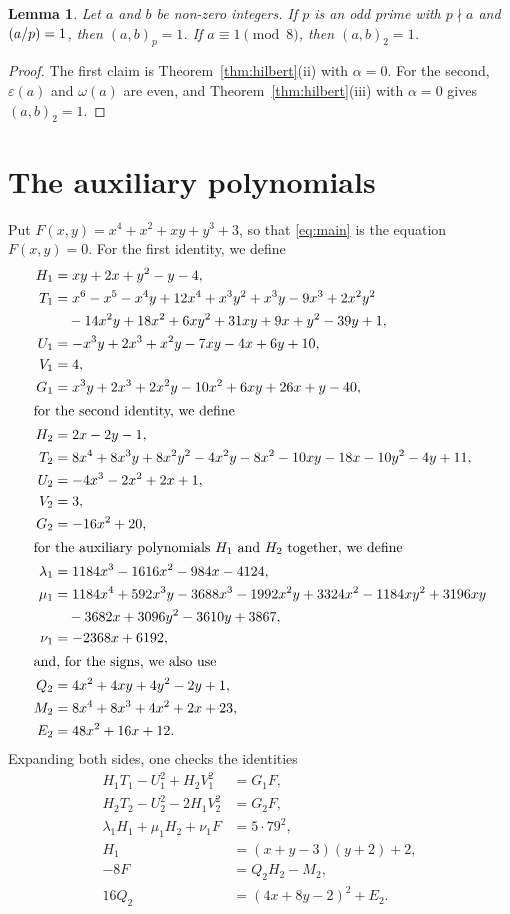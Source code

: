 \documentclass[11pt]{article}
\newtheorem{lemma}[theorem]{Lemma}
\newcommand{\leg}[2]{\mathchoice{\biggl(\dfrac{#1}{#2}\biggr)}{(#1/#2)}{(#1/#2)}{(#1/#2)}}
\begin{document}
\begin{lemma}\label{lem:square}
Let $a$ and $b$ be non-zero integers. If $p$ is an odd prime with $p\nmid a$ and $\leg{a}{p}=1$, then $(a,b)_p=1$. If $a\equiv1\pmod8$, then $(a,b)_2=1$.
\end{lemma}

\begin{proof}
The first claim is Theorem~\ref{thm:hilbert}(ii) with $\alpha=0$. For the second, $\varepsilon(a)$ and $\omega(a)$ are even, and Theorem~\ref{thm:hilbert}(iii) with $\alpha=0$ gives $(a,b)_2=1$.
\end{proof}

\section{The auxiliary polynomials}

Put $F(x,y)=x^{4}+x^{2}+xy+y^{3}+3$, so that \eqref{eq:main} is the equation $F(x,y)=0$. For the first identity, we define
\begin{align*}
H_{1}&=xy+2x+y^{2}-y-4,\\
T_{1}&=x^{6}-x^{5}-x^{4}y+12x^{4}+x^{3}y^{2}+x^{3}y-9x^{3}+2x^{2}y^{2}\\
&\quad-14x^{2}y+18x^{2}+6xy^{2}+31xy+9x+y^{2}-39y+1,\\
U_{1}&=-x^{3}y+2x^{3}+x^{2}y-7xy-4x+6y+10,\\
V_{1}&=4,\\
G_{1}&=x^{3}y+2x^{3}+2x^{2}y-10x^{2}+6xy+26x+y-40,\\
\intertext{for the second identity, we define}
H_{2}&=2x-2y-1,\\
T_{2}&=8x^{4}+8x^{3}y+8x^{2}y^{2}-4x^{2}y-8x^{2}-10xy-18x-10y^{2}-4y+11,\\
U_{2}&=-4x^{3}-2x^{2}+2x+1,\\
V_{2}&=3,\\
G_{2}&=-16x^{2}+20,\\
\intertext{for the auxiliary polynomials $H_{1}$ and $H_{2}$ together, we define}
\lambda_{1}&=1184x^{3}-1616x^{2}-984x-4124,\\
\mu_{1}&=1184x^{4}+592x^{3}y-3688x^{3}-1992x^{2}y+3324x^{2}-1184xy^{2}+3196xy\\
&\quad-3682x+3096y^{2}-3610y+3867,\\
\nu_{1}&=-2368x+6192,\\
\intertext{and, for the signs, we also use}
Q_{2}&=4x^{2}+4xy+4y^{2}-2y+1,\\
M_{2}&=8x^{4}+8x^{3}+4x^{2}+2x+23,\\
E_{2}&=48x^{2}+16x+12.
\end{align*}
Expanding both sides, one checks the identities
\begin{align}
H_{1}T_{1}-U_{1}^2+H_{2}V_{1}^2&=G_{1}F,\label{eq:norm1}\\
H_{2}T_{2}-U_{2}^2-2H_{1}V_{2}^2&=G_{2}F,\label{eq:norm2}\\
\lambda_{1}H_{1}+\mu_{1}H_{2}+\nu_{1}F&=5\cdot 79^{2},\label{eq:cross1}\\
H_{1}&=(x+y-3)(y+2)+2,\label{eq:sign1}\\
-8F&=Q_{2}H_{2}-M_{2},\label{eq:sign2}\\
16Q_{2}&=(4x+8y-2)^2+E_{2}.\label{eq:sign2b}
\end{align}
\end{document}
